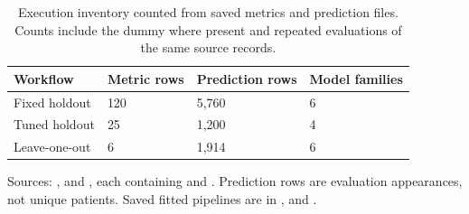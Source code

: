 \begin{table}[H]
\centering\small
\caption{Execution inventory counted from saved metrics and prediction files. Counts include the dummy where present and repeated evaluations of the same source records.}
\begin{tabular}{llll}
\toprule
Workflow & Metric rows & Prediction rows & Model families \\
\midrule
Fixed holdout & 120 & 5,760 & 6 \\
Tuned holdout & 25 & 1,200 & 4 \\
Leave-one-out & 6 & 1,914 & 6 \\
\bottomrule
\end{tabular}
\end{table}

Sources: ,  and , each containing  and . Prediction rows are evaluation appearances, not unique patients. Saved fitted pipelines are in ,  and .
